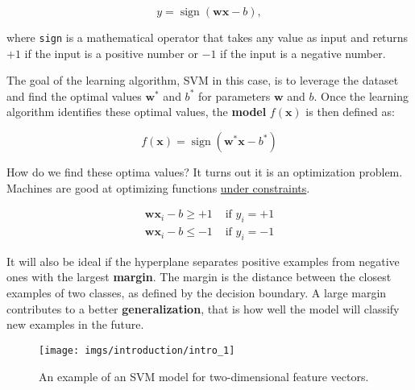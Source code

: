 $$
	y=\operatorname{sign}(\mathbf{w} \mathbf{x}-b),
$$

where \verb*|sign| is a mathematical operator that takes any value as input and returns $+1$ if the input is a positive number or $-1$ if the input is a negative number.

The goal of the learning algorithm, SVM in this case, is to leverage the dataset and find the optimal values \(\mathbf{w}^{*}\) and $b^{*}$ for parameters $\mathbf{w}$ and $b$. Once the learning algorithm identifies these optimal values, the \textbf{model} $f(\mathbf{x})$ is then defined as:

\begin{equation*}
	f(\mathbf{x})=\operatorname{sign}\left(\mathbf{w}^* \mathbf{x}-b^*\right)
\end{equation*}


How do we find these optima values? It turns out it is an optimization problem. Machines are good at optimizing functions \underline{under constraints}.

$$
	\begin{array}{ll}
		\mathbf{w} \mathbf{x}_{i}-b \geq+1 & \text { if } y_{i}=+1 \\
		\mathbf{w} \mathbf{x}_{i}-b \leq-1 & \text { if } y_{i}=-1
	\end{array}
$$

It will also be ideal if the hyperplane separates positive examples from negative ones with the largest \textbf{margin}. The margin is the distance between the closest examples of two classes, as defined by the decision boundary. A large margin contributes to a better \textbf{generalization}, that is how well the model will classify new examples in the future.

\begin{figure}[H]
	\centering
	\texttt{[image: imgs/introduction/intro\_1]}
	\caption{An example of an SVM model for two-dimensional feature vectors.}
	\label{fig:intro1}
\end{figure}

